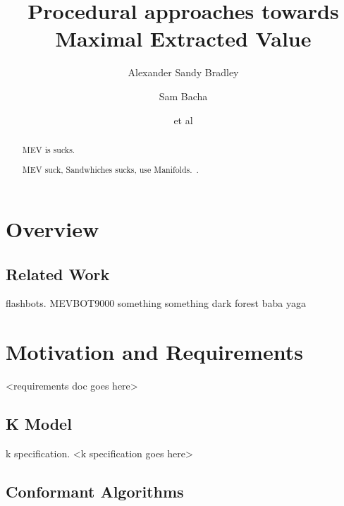 \documentclass[runningheads]{llncs}
\begin{document}
%
\title{Procedural approaches towards Maximal Extracted Value}
%
\author{Alexander Sandy Bradley \and
Sam Bacha \and
et al}
%
%


%
\maketitle              %
%
\begin{abstract}
MEV is sucks.

\end{abstract}
%
%
%
\section{Overview}
		\begin{abstract}
MEV suck, Sandwhiches sucks, use Manifolds.~\cite{openmev}.

	\end{abstract}
\subsection{Related Work}

flashbots.
MEVBOT9000
something something dark forest
baba yaga


\section{Motivation and Requirements}

<requirements doc goes here>

\subsection{K Model}

k specification. <k specification goes here>

\subsection{Conformant Algorithms}	
\end{document}
